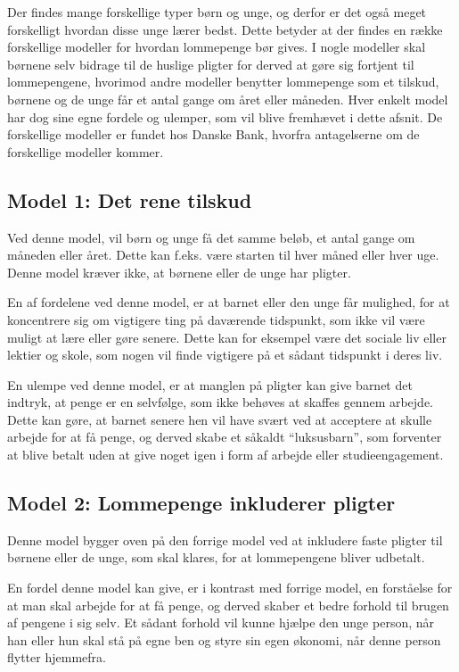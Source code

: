 Der findes mange forskellige typer børn og unge, 
og derfor er det også meget forskelligt hvordan 
disse unge lærer bedst. Dette betyder at 
der findes en række forskellige modeller for 
hvordan lommepenge bør gives. I nogle modeller 
skal børnene selv bidrage til de huslige pligter 
for derved at gøre sig fortjent til 
lommepengene, hvorimod andre modeller benytter 
lommepenge som et tilskud, børnene og de unge 
får et antal gange om året eller måneden. Hver 
enkelt model har dog sine egne fordele og 
ulemper, som vil blive fremhævet i dette afsnit. 
De forskellige modeller er fundet hos Danske 
Bank, hvorfra antagelserne om de forskellige 
modeller kommer\cite{DanskeB2}\cite{DanskeB3}.

\subsection{Model 1: Det rene tilskud}
Ved denne model, vil børn og unge få det samme 
beløb, et antal gange om måneden eller året. 
Dette kan f.eks. være starten til hver måned 
eller hver uge. Denne model kræver ikke, 
at børnene eller de unge har pligter.

En af fordelene ved denne model, er at barnet 
eller den unge får mulighed, for at koncentrere 
sig om vigtigere ting på daværende tidspunkt, 
som ikke vil være muligt at lære eller gøre 
senere. Dette kan for eksempel være det sociale 
liv eller lektier og skole, som nogen vil finde 
vigtigere på et sådant tidspunkt i deres liv.

En ulempe ved denne model, er at manglen på 
pligter kan give barnet det indtryk, at penge er 
en selvfølge, som ikke behøves at skaffes gennem 
arbejde. Dette kan gøre, at barnet senere hen 
vil have svært ved at acceptere at skulle 
arbejde for at få penge, og derved skabe et 
såkaldt “luksusbarn”, som forventer at blive 
betalt uden at give noget igen i form af 
arbejde eller studieengagement.

\subsection{Model 2: Lommepenge inkluderer 
pligter}
Denne model bygger oven på den forrige model ved 
at inkludere faste pligter til børnene eller de 
unge, som skal klares, for at lommepengene 
bliver udbetalt.

En fordel denne model kan give, er i kontrast med 
forrige model, en forståelse for at man skal 
arbejde for at få penge, og derved skaber et 
bedre forhold til brugen af pengene i sig selv. 
Et sådant forhold vil kunne hjælpe den unge 
person, når han eller hun skal stå på egne ben 
og styre sin egen økonomi, når denne person 
flytter hjemmefra.

